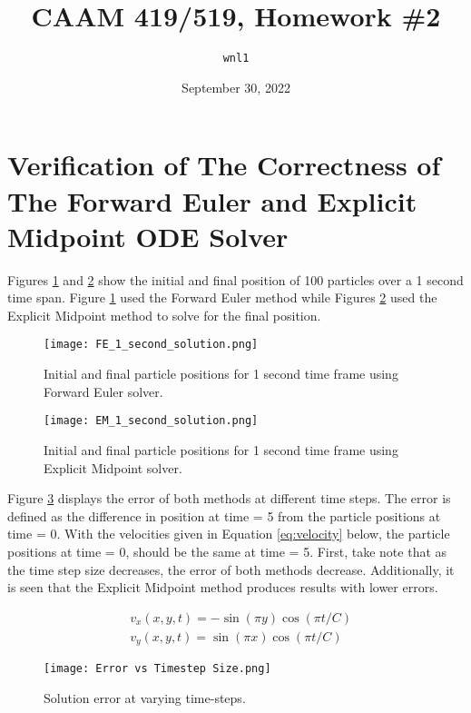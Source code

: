 \documentclass{article}
\title{CAAM 419/519, Homework \#2}
\author{\texttt{wnl1}}
\date{September 30, 2022}
\begin{document}
\maketitle

\section{Verification of The Correctness of The Forward Euler and Explicit Midpoint ODE Solver}

Figures \ref{fig:FE1} and \ref{fig:EM1} show the initial and final position of 100 particles over a 1 second time span. Figure \ref{fig:FE1} used the Forward Euler method while Figures \ref{fig:EM1} used the Explicit Midpoint method to solve for the final position.

\begin{figure}[h!]
  \centering
  \texttt{[image: FE\_1\_second\_solution.png]}
  \caption{Initial and final particle positions for 1 second time frame using Forward Euler solver.}
  \label{fig:FE1}
\end{figure}

\begin{figure}[h!]
  \centering
  \texttt{[image: EM\_1\_second\_solution.png]}
  \caption{Initial and final particle positions for 1 second time frame using Explicit Midpoint solver.}
  \label{fig:EM1}
\end{figure}

Figure \ref{fig:EvT} displays the error of both methods at different time steps. The error is defined as the difference in position at time = 5 from the particle positions at time = 0. With the velocities given in Equation \ref{eq:velocity} below, the particle positions at time = 0, should be the same at time = 5. First, take note that as the time step size decreases, the error of both methods decrease. Additionally, it is seen that the Explicit Midpoint method produces results with lower errors.

\begin{equation*}
  \label{eq:velocity}
  \begin{split}
    & v_x(x, y, t) = -\sin (\pi y) \cos (\pi t/C) \\
    & v_y(x, y, t) = \sin (\pi x) \cos (\pi t/C)
  \end{split}
\end{equation*}

\begin{figure}[h!]
  \centering
  \texttt{[image: Error vs Timestep Size.png]}
  \caption{Solution error at varying time-steps.}
  \label{fig:EvT}
\end{figure}
\end{document}
